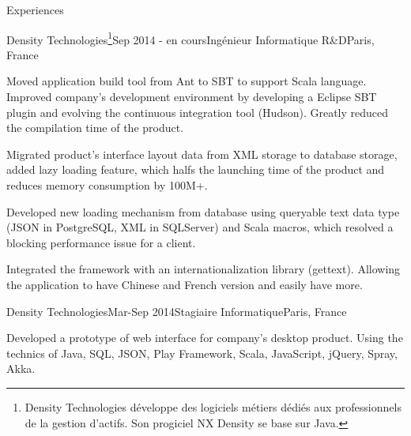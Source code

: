 \documentclass{resume} %
\begin{document}

\begin{rSection}{Experiences}

\begin{rSubsection}{Density Technologies\footnote{Density Technologies développe des logiciels métiers dédiés aux professionnels de la gestion d’actifs. Son progiciel NX Density se base sur Java.}}{Sep 2014 - en cours}{Ingénieur Informatique R\&D}{Paris, France}
\item Moved application build tool from Ant to SBT to support Scala language. Improved company's development environment by developing a Eclipse SBT plugin and evolving the continuous integration tool (Hudson). Greatly reduced the compilation time of the product.
\item Migrated product's interface layout data from XML storage to database storage, added lazy loading feature, which halfs the launching time of the product and reduces memory consumption by 100M+.
\item Developed new loading mechanism from database using queryable text data type (JSON in PostgreSQL, XML in SQLServer) and Scala macros, which resolved a blocking performance issue for a client.
\item Integrated the framework with an internationalization library (gettext). Allowing the application to have Chinese and French version and easily have more.
\end{rSubsection}

\begin{rSubsection}{Density Technologies}{Mar-Sep 2014}{Stagiaire Informatique}{Paris, France}
\item Developed a prototype of web interface for company's desktop product. Using the technics of Java, SQL, JSON, Play Framework, Scala, JavaScript, jQuery, Spray, Akka.
\end{rSubsection}

\end{rSection}


 
\end{document}
